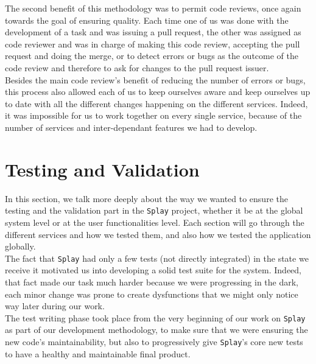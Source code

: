 \documentclass{eplmastersthesis}
\begin{document}
          The second benefit of this methodology was to
          permit code reviews, once again towards the goal of ensuring quality.
          Each time one of us was done with the development of a
          task and was issuing a pull request, the other was assigned as code
          reviewer and was in charge of making this code review, accepting the
          pull request and doing the merge, or to detect errors or bugs as the
          outcome of the code review and therefore to ask for changes to the
          pull request issuer.\\

          Besides the main code review's benefit of reducing the number of
          errors or bugs, this process also allowed each of us to keep ourselves
          aware and keep ourselves up to date with all the different changes
          happening on the different services. Indeed, it was impossible for
          us to work together on every single service, because
          of the number of services and inter-dependant features we had to
          develop.

    \section{Testing and Validation}

      In this section, we talk more deeply about the way we wanted to ensure
      the testing and the validation part in the \texttt{Splay} project, whether it be
      at the global system level or at the user functionalities level. Each
      section will go through the different services and how we tested them, and
      also how we tested the application globally.\\

      The fact that \texttt{Splay} had only a few tests (not directly integrated) in the state we receive it
      motivated us into developing a solid test suite for the system.
      Indeed, that fact made our task much harder because we were progressing
      in the dark, each minor change was prone to create dysfunctions that we
      might only notice way later during our work.\\

      The test writing phase took place from the very beginning of our work on
      \texttt{Splay} as part of our development methodology,
      to make sure that we were ensuring the new code's maintainability, but
      also to progressively give \texttt{Splay}'s core new tests to have a healthy
      and maintainable final product.\\
\end{document}
